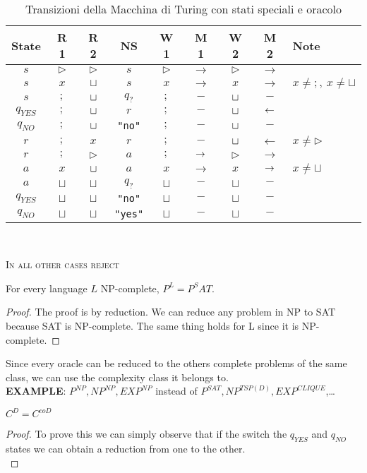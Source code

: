 \begin{table}[ht]
\begin{center}
\renewcommand{\arraystretch}{1.2}
\begin{tabular}{|c|c|c|c|c|c|c|c|l|}
\hline
\textbf{State} & \textbf{R 1} & \textbf{R 2} & \textbf{NS} & \textbf{W 1} & \textbf{M 1} & \textbf{W 2} & \textbf{M 2} & \textbf{Note} \\
\hline
$s$ & $\triangleright$ & $\triangleright$ & $s$ & $\triangleright$ & $\rightarrow$ & $\triangleright$ & $\rightarrow$ & \\
$s$ & $x$ & $\sqcup$ & $s$ & $x$ & $\rightarrow$ & $x$ & $\rightarrow$ & $x \neq ;,\ x \neq \sqcup$ \\
$s$ & $;$ & $\sqcup$ & $q_?$ & $;$ & $-$ & $\sqcup$ & $-$ & \\
$q_{YES}$ & $;$ & $\sqcup$ & $r$ & $;$ & $-$ & $\sqcup$ & $\leftarrow$ & \\
$q_{NO}$ & $;$ & $\sqcup$ & \texttt{"no"} & $;$ & $-$ & $\sqcup$ & $-$ & \\
$r$ & $;$ & $x$ & $r$ & $;$ & $-$ & $\sqcup$ & $\leftarrow$ & $x \neq \triangleright$ \\  
$r$ & $;$ & $\triangleright$ & $a$ & $;$ & $\rightarrow$ & $\triangleright$ & $\rightarrow$ & \\
$a$ & $x$ & $\sqcup$ & $a$ & $x$ & $\rightarrow$ & $x$ & $\rightarrow$ & $x \neq \sqcup$ \\
$a$ & $\sqcup$ & $\sqcup$ & $q_?$ & $\sqcup$ & $-$ & $\sqcup$ & $-$ & \\
$q_{YES}$ & $\sqcup$ & $\sqcup$ & \texttt{"no"} & $\sqcup$ & $-$ & $\sqcup$ & $-$ & \\
$q_{NO}$ & $\sqcup$ & $\sqcup$ & \texttt{"yes"} & $\sqcup$ & $-$ & $\sqcup$ & $-$ &  \\
\hline
\end{tabular}
\\
\end{center}
\textsc{In all other cases reject}
\caption{Transizioni della Macchina di Turing con stati speciali e oracolo}
\end{table}
\newpage
\begin{defbox}[Proposition]
  For every language $L$ \textsc{NP}-complete, $P^L=P^SAT$.
\end{defbox}
\begin{proof}
  The proof is by reduction. We can reduce any problem in \textsc{NP} to \textsc{SAT} because \textsc{SAT} is \textsc{NP}-complete. The same thing holds for \textsc{L} since it is \textsc{NP}-complete.
\end{proof}
Since every oracle can be reduced to the others complete problems of the same class, we can use the complexity class it belongs to.\\
\textbf{EXAMPLE}: $P^{NP}, NP^{NP}, EXP^{NP}$ instead of $P^{SAT}, NP^{TSP(D)}, EXP^{CLIQUE}$,\dots
\begin{defbox}[Proposition]
  $C^D=C^{coD}$
\end{defbox}
\begin{proof}
  To prove this we can simply observe that if the switch the $q_{YES}$ and $q_{NO}$ states we can obtain a reduction from one to the other.\\
\end{proof}

